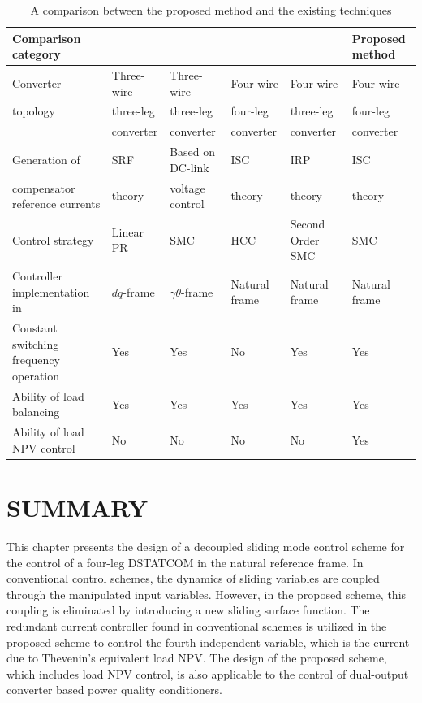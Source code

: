 \begin{landscape}
	\begin{table}[ht] 
		\centering
		\setlength\extrarowheight{2pt}
		\caption{A comparison between the proposed method and the existing techniques} 
		\label{Table4.3}
		\begin{tabular}{>{\small }l>{\small }l>{\small }l>{\small }l>{\small }l>{\small }l}  
			\hline
			\hline
			\textbf{Comparison category} & \textbf{ \cite{6880399}} & \textbf{ \cite{8264745}} & \textbf{\cite{8281573}} & \textbf{\cite{8998568}}  & \textbf{ Proposed method} \\
			\hline
			Converter & Three-wire & Three-wire & Four-wire & Four-wire & Four-wire \\
			topology & three-leg & three-leg & four-leg & three-leg & four-leg \\
			& converter & converter & converter & converter & converter \\
			\hline
			Generation of &SRF & Based on DC-link & ISC & IRP & ISC  \\ 
			compensator reference currents & theory & voltage control & theory & theory & theory \\
			\hline
			Control strategy & Linear PR & SMC & HCC & Second Order SMC & SMC \\
			\hline
			Controller implementation in & $dq$-frame & $\gamma\theta$-frame & Natural frame & Natural frame & Natural frame \\
			\hline
			Constant switching frequency operation  &  Yes & Yes & No & Yes & Yes \\
			\hline
			Ability of load balancing  &  Yes & Yes & Yes & Yes & Yes \\  \hline
			Ability of load NPV control  &  No & No & No & No & Yes \\  
			\hline
			\hline 
		\end{tabular}  
	\end{table}
\end{landscape}

\section{SUMMARY}
This chapter presents the design of a decoupled sliding mode control scheme for the control of a four-leg DSTATCOM in the natural reference frame. In conventional control schemes, the dynamics of sliding variables are coupled through the manipulated input variables. However, in the proposed scheme, this coupling is eliminated by introducing a new sliding surface function. The redundant current controller found in conventional schemes is utilized in the proposed scheme to control the fourth independent variable, which is the current due to Thevenin's equivalent load NPV. The design of the proposed scheme, which includes load NPV control, is also applicable to the control of dual-output converter based power quality conditioners.

